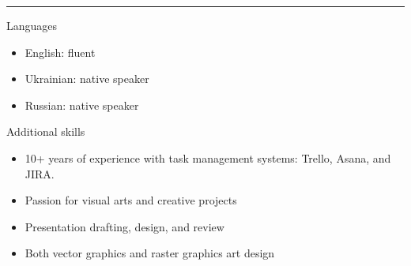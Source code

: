 \documentclass[a4paper,10pt]{article}
\newlength{\cvcolumngapwidth}
\newlength{\cvleftcolumnwidth}
\newlength{\cvrightcolumnwidth}
\newcommand{\cvsectionstyle}[1]{{\normalsize\cvsectionfont\textcolor{cvsectioncolor}{#1}}}
\newcommand{\cvheadingstyle}[1]{{\normalsize\cvheadingfont\textcolor{cvheadingcolor}{#1}}}
\newlength{\cvafteritemskipamount}
\newlength{\cvaftersectionskipamount}
\newlength{\cvbetweensectionandheadingextraskipamount}
\newlength{\cvparskip}
\newcommand{\cvsection}[1]{
\begin{minipage}[t]{\cvleftcolumnwidth}
    \raggedleft\cvsectionstyle{#1}
\end{minipage}%
\hspace{\cvcolumngapwidth}%
\begin{minipage}[t]{\cvrightcolumnwidth}
    \textcolor{cvrulecolor}{\rule{\cvrightcolumnwidth}{0.3mm}}
\end{minipage}

\vspace{\cvaftersectionskipamount}
}
\newcommand{\cvitem}[2]{
\begin{minipage}[t]{\cvleftcolumnwidth}
    \raggedleft #1
\end{minipage}%
\hspace{\cvcolumngapwidth}%
\begin{minipage}[t]{\cvrightcolumnwidth}
    \setlength{\parskip}{\cvparskip} #2
\end{minipage}

\vspace{\cvafteritemskipamount}
}
\begin{document}

\cvsection{SKILLS}

\vspace{\cvbetweensectionandheadingextraskipamount}

\cvitem{
\cvheadingstyle{Languages}
}{
    \begin{itemize}
        \item \cvsectionstyle{English}: fluent 
        \item \cvsectionstyle{Ukrainian}: native speaker
        \item \cvsectionstyle{Russian}: native speaker
    \end{itemize}
}

\cvitem{
\cvheadingstyle{Additional skills}
}{
    \begin{itemize}
        \item 10+ years of experience with task management systems: Trello, Asana, and JIRA.
        \item Passion for visual arts and creative projects
        \item Presentation drafting, design, and review
        \item Both vector graphics and raster graphics art design
    \end{itemize}

}










\end{document}
